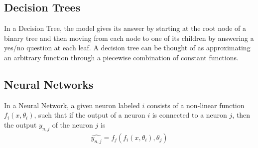 \documentclass{report}
\begin{document}
\subsection{Decision Trees}
In a Decision Tree, the model gives its answer by starting at the root node of a binary tree and then moving from each node to one of its children by answering a yes/no question at each leaf. A decision tree can be thought of as approximating an arbitrary function through a piecewise combination of constant functions.
%
\subsection{Neural Networks}
In a Neural Network, a given neuron labeled $i$ consists of a non-linear function $f_i(x, \theta_i)$, such that if the output of a neuron $i$ is connected to a neuron $j$, then the output $\hat{y_{n,j}}$ of the neuron $j$ is
\begin{align*}
 \hat{y_{n,j}} = f_j(f_i(x, \theta_i), \theta_j)
\end{align*}
%
\end{document}

